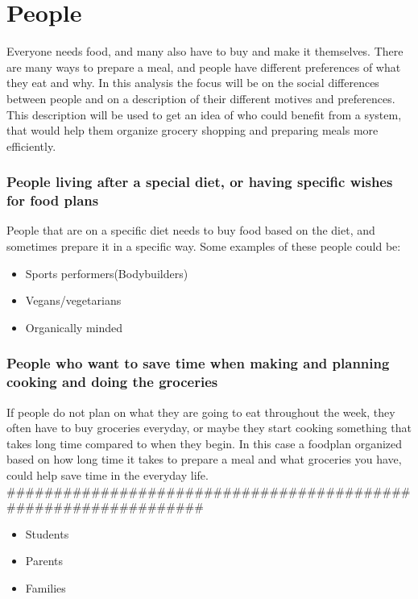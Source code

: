 \section{People}
Everyone needs food, and many also have to buy and make it themselves. There are many ways to prepare a meal, and people have different preferences of what they eat and why. In this analysis the focus will be on the social differences between people and on a description of their different motives and preferences. This description will be used to get an idea of who could benefit from a system, that would help them organize grocery shopping and preparing meals more efficiently.

\subsubsection{People living after a special diet, or having specific wishes for food plans}
People that are on a specific diet needs to buy food based on the diet, and sometimes prepare it in a specific way.
Some examples of these people could be:
\begin{itemize}
\item Sports performers(Bodybuilders)
\item Vegans/vegetarians
\item Organically minded
\end{itemize}

\subsubsection{People who want to save time when making and planning cooking and doing the groceries} 
If people do not plan on what they are going to eat throughout the week, they often have to buy groceries everyday, or maybe they start cooking something that takes long time compared to when they begin. In this case a foodplan organized based on how long time it takes to prepare a meal and what groceries you have, could help save time in the everyday life. ################################################################
\begin{itemize}
\item Students
\item Parents
\item Families
\end{itemize}

